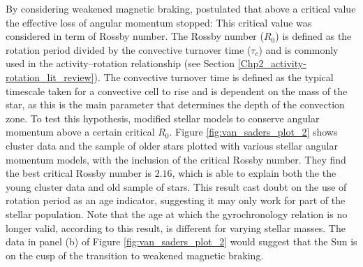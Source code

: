 By considering weakened magnetic braking, \citet{van_Saders_etal_2016} postulated that above a critical value the effective loss of angular momentum stopped: This critical value was considered in term of Rossby number. The Rossby number ($R_{0}$) is defined as the rotation period divided by the convective turnover time ($\tau_{c}$) and is commonly used in the activity--rotation relationship (see Section \ref{Chp2_activity-rotation_lit_review}). The convective turnover time is defined as the typical timescale taken for a convective cell to rise and is dependent on the mass of the star, as this is the main parameter that determines the depth of the convection zone. To test this hypothesis, \citet{van_Saders_etal_2016} modified stellar models to conserve angular momentum above a certain critical $R_{0}$. Figure \ref{fig:van_saders_plot_2} shows cluster data and the sample of older stars plotted with various stellar angular momentum models, with the inclusion of the critical Rossby number. They find the best critical Rossby number is $2.16$, which is able to explain both the the young cluster data and old sample of stars. This result cast doubt on the use of rotation period as an age indicator, suggesting it may only work for part of the stellar population. Note that the age at which the gyrochronology relation is no longer valid, according to this result, is different for varying stellar masses. The data in panel (b) of Figure \ref{fig:van_saders_plot_2} would suggest that the Sun is on the cusp of the transition to weakened magnetic braking.

